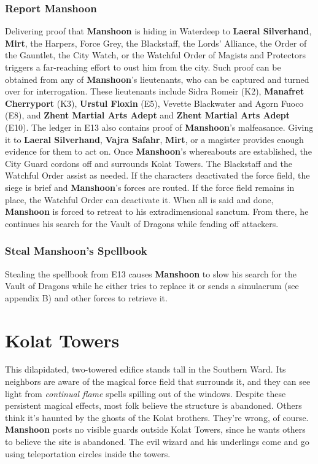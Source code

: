 \documentclass[10pt,a4paper,twoside,twocolumn,openany,nodeprecatedcode]{dndbook}
\begin{document}
\subsubsection{Report Manshoon}
Delivering proof that \textbf{Manshoon} is hiding in Waterdeep to \textbf{Laeral Silverhand}, \textbf{Mirt}, the Harpers, Force Grey, the Blackstaff, the Lords' Alliance, the Order of the Gauntlet, the City Watch, or the Watchful Order of Magists and Protectors triggers a far-reaching effort to oust him from the city. Such proof can be obtained from any of \textbf{Manshoon}'s lieutenants, who can be captured and turned over for interrogation. These lieutenants include Sidra Romeir (K2), \textbf{Manafret Cherryport} (K3), \textbf{Urstul Floxin} (E5), Vevette Blackwater and Agorn Fuoco (E8), and \textbf{Zhent Martial Arts Adept} and \textbf{Zhent Martial Arts Adept} (E10).
The ledger in E13 also contains proof of \textbf{Manshoon}'s malfeasance. Giving it to \textbf{Laeral Silverhand}, \textbf{Vajra Safahr}, \textbf{Mirt}, or a magister provides enough evidence for them to act on.
Once \textbf{Manshoon}'s whereabouts are established, the City Guard cordons off and surrounds Kolat Towers. The Blackstaff and the Watchful Order assist as needed. If the characters deactivated the force field, the siege is brief and \textbf{Manshoon}'s forces are routed. If the force field remains in place, the Watchful Order can deactivate it.
When all is said and done, \textbf{Manshoon} is forced to retreat to his extradimensional sanctum. From there, he continues his search for the Vault of Dragons while fending off attackers.
\subsubsection{Steal Manshoon's Spellbook}
Stealing the spellbook from E13 causes \textbf{Manshoon} to slow his search for the Vault of Dragons while he either tries to replace it or sends a simulacrum (see appendix B) and other forces to retrieve it.
\section{Kolat Towers}
This dilapidated, two-towered edifice stands tall in the Southern Ward. Its neighbors are aware of the magical force field that surrounds it, and they can see light from \textit{continual flame} spells spilling out of the windows. Despite these persistent magical effects, most folk believe the structure is abandoned. Others think it's haunted by the ghosts of the Kolat brothers. They're wrong, of course.
\textbf{Manshoon} posts no visible guards outside Kolat Towers, since he wants others to believe the site is abandoned. The evil wizard and his underlings come and go using teleportation circles inside the towers.
\end{document}
